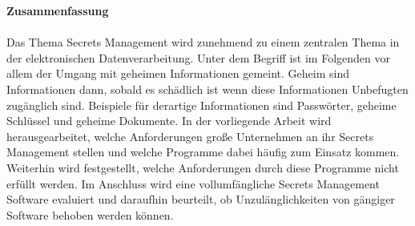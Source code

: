 \documentclass[
book,
a4paper,   
titlepage,  
halfparskip,
12pt        
]{scrartcl}
\begin{document}
%

\thispagestyle{empty}

\large{\textbf{Zusammenfassung}}\\
\\
Das Thema Secrets Management wird zunehmend zu einem zentralen Thema in der
elektronischen Datenverarbeitung.  Unter dem Begriff ist im Folgenden vor
allem der Umgang mit geheimen Informationen gemeint.  Geheim sind
Informationen dann, sobald es schädlich ist wenn diese Informationen
Unbefugten zugänglich sind. Beispiele für derartige Informationen sind
Passwörter, geheime Schlüssel und geheime Dokumente. In der vorliegende Arbeit
wird herausgearbeitet, welche Anforderungen große Unternehmen
an ihr Secrets Management stellen und welche Programme dabei häufig zum
Einsatz kommen. Weiterhin wird festgestellt, welche
Anforderungen durch diese Programme nicht erfüllt werden. Im Anschluss
wird eine vollumfängliche Secrets Management Software evaluiert und daraufhin beurteilt, 
ob Unzulänglichkeiten von gängiger Software behoben
werden können. 
\end{document}
